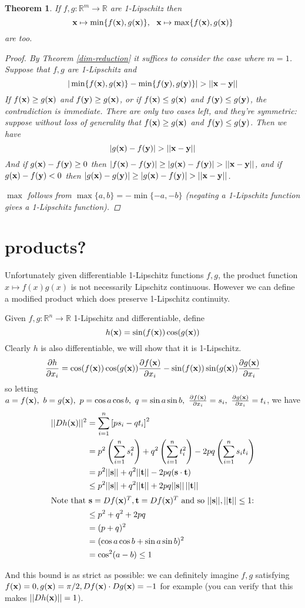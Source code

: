 \documentclass{article}
\newcommand\bb\mathbb
\renewcommand\vec\textbf
\renewcommand\l\left
\renewcommand\r\right
\newtheorem{theorem}{Theorem}
\newcommand\pp[2]{\frac{\partial #1}{\partial #2}}
\begin{document}
\begin{theorem}
\label{minmax}
If $f,g:\bb R^m\to\bb R$ are 1-Lipschitz then
$$\vec x\mapsto \min\{f(\vec x),g(\vec x)\},~~\vec x\mapsto \max\{f(\vec x),g(\vec x)\}$$
are too.
\begin{proof}
By Theorem \ref{dim-reduction} it suffices to consider the case where $m=1$.
Suppose that $f,g$ are 1-Lipschitz and
$$|\min\{f(\vec x),g(\vec x)\} - \min\{f(\vec y),g(\vec y)\}| > ||\vec x-\vec y||$$
If $f(\vec x) \geq g(\vec x)$ and $f(\vec y) \geq g(\vec x)$, or if $f(\vec x) \leq g(\vec x)$ and $f(\vec y) \leq g(\vec y)$,
the contradiction is immediate. There are only two cases left, and they're symmetric:
suppose without loss of generality that $f(\vec x) \geq g(\vec x)$ and $f(\vec y)\leq g(\vec y)$. Then
we have
$$|g(\vec x) - f(\vec y)| > ||\vec x-\vec y||$$
And if $g(\vec x)-f(\vec y) \geq 0$ then $|f(\vec x) - f(\vec y)| \geq |g(\vec x) - f(\vec y)| > ||\vec x-\vec y||$,
and if $g(\vec x)-f(\vec y) < 0$ then $|g(\vec x) - g(\vec y)| \geq |g(\vec x) - f(\vec y)| > ||\vec x-\vec y||$.

$\max$ follows from $\max\{a,b\} = -\min\{-a,-b\}$ (negating a 1-Lipschitz function gives
a 1-Lipschitz function).
\end{proof}
\end{theorem}


\section{products?}
Unfortunately given differentiable 1-Lipschitz functions $f,g$, the product function $x\mapsto f(x)g(x)$
is not necessarily Lipschitz continuous. However we can define a modified product which does
preserve 1-Lipschitz continuity.

Given $f,g:\bb R^n \to \bb R$ 1-Lipschitz and differentiable, define
$$h(\vec x) = \sin (f(\vec x))\cos(g(\vec x))$$
Clearly $h$ is also differentiable, we will show that it is 1-Lipschitz.
$$\pp h{x_i} = \cos(f(\vec x))\cos(g(\vec x)) \pp{f(\vec x)}{x_i}- \sin(f(\vec x))\sin(g(\vec x))  \pp{g(\vec x)}{x_i}$$
so letting $a=f(\vec x),~b=g(\vec x),~p = \cos a\cos b,~q = \sin a\sin b,~\pp{f(\vec x)}{x_i} = s_i,~\pp{g(\vec x)}{x_i} = t_i$, we have
\begin{align*}
||Dh(\vec x)||^2 &= \sum_{i=1}^n \left[ps_i - qt_i\right]^2\\
&=p^2\l(\sum_{i=1}^n  s_i^2\r) +  q^2\l(\sum_{i=1}^n  t_i^2\r)- 2pq\l(\sum_{i=1}^n s_it_i\r)\\
&=p^2||\vec s|| + q^2||\vec t||- 2pq(\vec s\cdot \vec t)\\
&\leq p^2||\vec s|| + q^2||\vec t||+ 2pq||\vec s||\,||\vec t||\\
\intertext{Note that $\vec s = Df(\vec x)^T,\vec t=Df(\vec x)^T$ and so $||\vec s||,||\vec t|| \leq 1$:}
&\leq p^2 + q^2 + 2pq\\
&= (p+q)^2\\
&= (\cos a\cos b + \sin a\sin b)^2\\
&= \cos^2(a-b) \leq 1
\end{align*}

And this bound is as strict as possible: we can definitely imagine $f,g$ satisfying
$f(\vec x) = 0,g(\vec x)=\pi/2, Df(\vec x)\cdot Dg(\vec x) = -1$ for example (you can verify that this
makes $||Dh(\vec x)|| = 1$).
\end{document}
